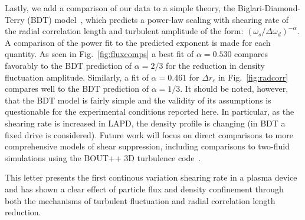 \documentclass[aps,prl,amsmath,amssymb,preprint,superscriptaddress]{revtex4}
\begin{document}
Lastly, we add a comparison of our data to a simple theory, the
Biglari-Diamond-Terry (BDT) model~\cite{biglari90}, which predicts a
power-law scaling with shearing rate of the radial correlation length and turbulent
amplitude of the form: $\left(\omega_{s}/\Delta
\omega_{d}\right)^{-\alpha}$. A comparison of the power fit to the
predicted exponent is made for each quantity. As seen in
Fig.~\ref{fig:fluxcomps} a best fit of $\alpha = 0.530$ compares
favorably to the BDT prediction of $\alpha = 2/3$ for the reduction in
density fluctuation amplitude. Similarly, a fit of $\alpha = 0.461$
for $\Delta r_{c}$ in Fig.~\ref{fig:radcorr} compares well to the BDT
prediction of $\alpha = 1/3$.   It should be noted, however, that the
BDT model is fairly simple and the validity of its assumptions is
questionable for the experimental conditions reported here.  In
particular, as the shearing rate is increased in LAPD, the density
profile is changing (in BDT a fixed drive is considered).  Future work
will focus on direct comparisons to more comprehensive models of shear
suppression, including comparisons to two-fluid simulations using the
BOUT++ 3D turbulence code~\cite{umansky11}.  




This letter presents the first continous variation shearing rate in a plasma device and has shown a clear effect of particle flux and density confinement through both the mechanisms of turbulent fluctuation and radial correlation length reduction.

\end{document}

